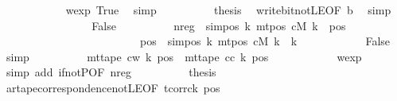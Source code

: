 \begin{isabellebody}
\ \ \ \ \ \ \ \ \ \ \isamarkupfalse%
\ wexp\ True\ \isamarkupfalse%
\ simp\isanewline
\ \ \ \ \ \ \ \ \isamarkupfalse%
\ {\isacharquery}{\kern0pt}thesis\ \isamarkupfalse%
\ write{\isacharunderscore}{\kern0pt}bit{\isacharunderscore}{\kern0pt}not{\isacharunderscore}{\kern0pt}LE{}{\isacharbrackleft}{\kern0pt}OF\ b{\isacharbrackright}{\kern0pt}\ \isamarkupfalse%
\ simp\isanewline
\ \ \ \ \ \ \isamarkupfalse%
\isanewline
\ \ \ \ \ \ \ \ \isamarkupfalse%
\ False\isanewline
\ \ \ \ \ \ \ \ \isamarkupfalse%
\ nreg{\isacharcolon}{\kern0pt}\ {\isachardoublequoteopen}{\isasymnot}\ {\isacharparenleft}{\kern0pt}sim{\isacharunderscore}{\kern0pt}pos\ {\isacharquery}{\kern0pt}k\ {\isacharparenleft}{\kern0pt}mt{\isacharunderscore}{\kern0pt}pos\ cM\ k{\isacharparenright}{\kern0pt}\ {\isasymle}\ pos\isanewline
\ \ \ \ \ \ \ \ \ \ \ \ \ \ \ \ \ \ \ \ \ \ \ \ {\isasymand}\ pos\ {\isacharless}{\kern0pt}\ sim{\isacharunderscore}{\kern0pt}pos\ {\isacharquery}{\kern0pt}k\ {\isacharparenleft}{\kern0pt}mt{\isacharunderscore}{\kern0pt}pos\ cM\ k{\isacharparenright}{\kern0pt}\ {\isacharplus}{\kern0pt}\ {\isacharquery}{\kern0pt}k{\isacharparenright}{\kern0pt}{\isachardoublequoteclose}\isanewline
\ \ \ \ \ \ \ \ \ \ \isamarkupfalse%
\ False\ \isamarkupfalse%
\ simp\isanewline
\ \ \ \ \ \ \ \ \isamarkupfalse%
\ {\isachardoublequoteopen}mt{\isacharunderscore}{\kern0pt}tape\ c{\isacharunderscore}{\kern0pt}w\ k\ pos\ {\isacharequal}{\kern0pt}\ mt{\isacharunderscore}{\kern0pt}tape\ c{\isacharunderscore}{\kern0pt}c\ k\ pos{\isachardoublequoteclose}\isanewline
\ \ \ \ \ \ \ \ \ \ \isamarkupfalse%
\ wexp\ \isamarkupfalse%
\ {\isacharparenleft}{\kern0pt}simp\ add{\isacharcolon}{\kern0pt}\ if{\isacharunderscore}{\kern0pt}not{\isacharunderscore}{\kern0pt}P{\isacharbrackleft}{\kern0pt}OF\ nreg{\isacharbrackright}{\kern0pt}{\isacharparenright}{\kern0pt}\isanewline
\ \ \ \ \ \ \ \ \isamarkupfalse%
\ {\isacharquery}{\kern0pt}thesis\isanewline
\ \ \ \ \ \ \ \ \ \ \isamarkupfalse%
\ ar{\isacharunderscore}{\kern0pt}tape{\isacharunderscore}{\kern0pt}correspondence{\isacharunderscore}{\kern0pt}not{\isacharunderscore}{\kern0pt}LE{}{\isacharbrackleft}{\kern0pt}OF\ tcorr{\isacharunderscore}{\kern0pt}ck\ pos{}{\isacharbrackright}{\kern0pt}\ \isamarkupfalse%

\end{isabellebody}
